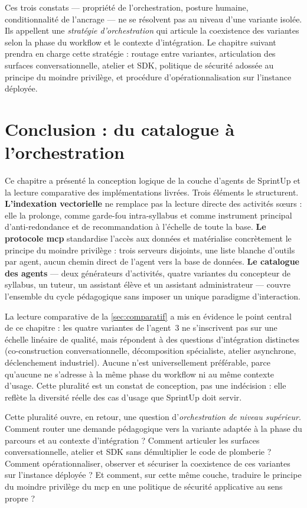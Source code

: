 Ces trois constats — propriété de l'orchestration, posture humaine,
conditionnalité de l'ancrage — ne se résolvent pas au niveau d'une
variante isolée. Ils appellent une \emph{stratégie d'orchestration}
qui articule la coexistence des variantes selon la phase du
workflow et le contexte d'intégration. Le chapitre suivant prendra
en charge cette stratégie : routage entre variantes, articulation des
surfaces conversationnelle, atelier et SDK, politique de sécurité
adossée au principe du moindre privilège, et procédure
d'opérationnalisation sur l'instance déployée.

\section{Conclusion : du catalogue à l'orchestration}
\label{sec:ch2-conclusion}

Ce chapitre a présenté la conception logique de la couche d'agents
de SprintUp et la lecture comparative des implémentations livrées.
Trois éléments le structurent. \textbf{L'indexation vectorielle} ne
remplace pas la lecture directe des activités sœurs : elle la
prolonge, comme garde-fou intra-syllabus et comme instrument
principal d'anti-redondance et de recommandation à l'échelle de
toute la base. \textbf{Le protocole \gls{mcp}} standardise l'accès
aux données et matérialise concrètement le principe du moindre
privilège : trois serveurs disjoints, une liste blanche d'outils par
agent, aucun chemin direct de l'agent vers la base de données.
\textbf{Le catalogue des agents} — deux générateurs d'activités,
quatre variantes du concepteur de syllabus, un tuteur, un assistant
élève et un assistant administrateur — couvre l'ensemble du cycle
pédagogique sans imposer un unique paradigme d'interaction.

La lecture comparative de la \textsection\ref{sec:comparatif} a mis
en évidence le point central de ce chapitre : les quatre variantes
de l'agent~3 ne s'inscrivent pas sur une échelle linéaire de
qualité, mais répondent à des questions d'intégration distinctes
(co-construction conversationnelle, décomposition spécialiste,
atelier asynchrone, déclenchement industriel). Aucune n'est
universellement préférable, parce qu'aucune ne s'adresse à la même
phase du workflow ni au même contexte d'usage. Cette pluralité est
un constat de conception, pas une indécision : elle reflète la
diversité réelle des cas d'usage que SprintUp doit servir.

Cette pluralité ouvre, en retour, une question d'\emph{orchestration
de niveau supérieur}. Comment router une demande pédagogique vers la
variante adaptée à la phase du parcours et au contexte d'intégration ?
Comment articuler les surfaces conversationnelle, atelier et SDK
sans démultiplier le code de plomberie ? Comment opérationnaliser,
observer et sécuriser la coexistence de ces variantes sur l'instance
déployée ? Et comment, sur cette même couche, traduire le principe
du moindre privilège du \gls{mcp} en une politique de sécurité
applicative au sens propre ?


